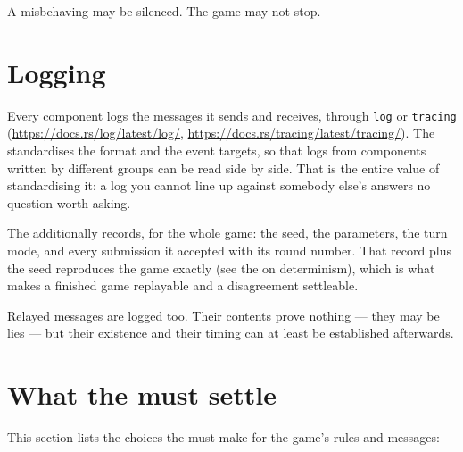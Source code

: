 \documentclass{article}
\begin{document}
A misbehaving \ship{} may be silenced. The game may not stop.

\newpage
\section{Logging}
\label{proto:logging}

Every component logs the messages it sends and receives, through \texttt{log} or \texttt{tracing}
(\url{https://docs.rs/log/latest/log/}, \url{https://docs.rs/tracing/latest/tracing/}). The \WG{}
standardises the format and the event targets, so that logs from components written by different
groups can be read side by side. That is the entire value of standardising it: a log you cannot
line up against somebody else's answers no question worth asking.

The \admiralty{} additionally records, for the whole game: the seed, the parameters, the turn mode,
and every submission it accepted with its round number. That record plus the seed reproduces the
game exactly (see the \MD{} on determinism), which is what makes a finished game replayable and a
disagreement settleable.

Relayed messages are logged too. Their contents prove nothing --- they may be lies --- but their
existence and their timing can at least be established afterwards.

\newpage
\section{What the \WG{} must settle}
\label{proto:todo}

This section lists the choices the \WG{} must make for the game's rules and messages:
\end{document}
